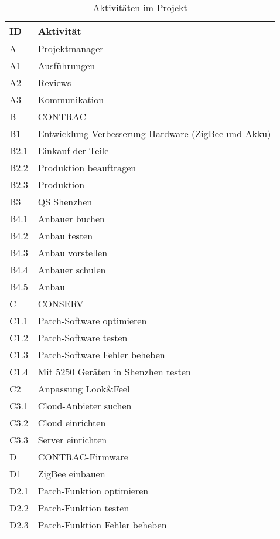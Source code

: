 \begin{table}[H]
	\renewcommand{\arraystretch}{1.05}
	\begin{center}
		\begin{tabular}{l|l}
			\hline
			\textbf{ID} & \textbf{Aktivität}\\\hline
			A    & Projektmanager\\ \hline
			A1   & Ausführungen\\ \hline
			A2   & Reviews\\ \hline
			A3 & Kommunikation \\\hline
			B    & CONTRAC\\ \hline
			B1   & Entwicklung Verbesserung Hardware (ZigBee und Akku) \\ \hline
			B2.1 & Einkauf der Teile\\\hline
			B2.2 & Produktion beauftragen\\ \hline
			B2.3 & Produktion\\ \hline
			B3 & QS Shenzhen\\ \hline
			B4.1 & Anbauer buchen\\ \hline
			B4.2 & Anbau testen\\ \hline
			B4.3 & Anbau vorstellen\\ \hline
			B4.4 & Anbauer schulen\\ \hline
			B4.5 & Anbau\\ \hline
			C    & CONSERV\\ \hline
			C1.1 & Patch-Software optimieren\\ \hline
			C1.2 & Patch-Software testen \\ \hline
			C1.3 & Patch-Software Fehler beheben\\ \hline
			C1.4   & Mit 5250 Geräten in Shenzhen testen\\ \hline
			C2 & Anpassung Look\&Feel\\\hline
			C3.1 & Cloud-Anbieter suchen \\ \hline
			C3.2 & Cloud einrichten      \\ \hline
			C3.3 & Server einrichten     \\ \hline
			D    & CONTRAC-Firmware      \\ \hline
			D1   & ZigBee einbauen       \\ \hline
			D2.1 & Patch-Funktion optimieren \\ \hline
			D2.2 & Patch-Funktion testen \\ \hline
			D2.3 & Patch-Funktion Fehler beheben  \\
		\end{tabular}
		\caption{Aktivitäten im Projekt}
	\end{center}
\end{table}

